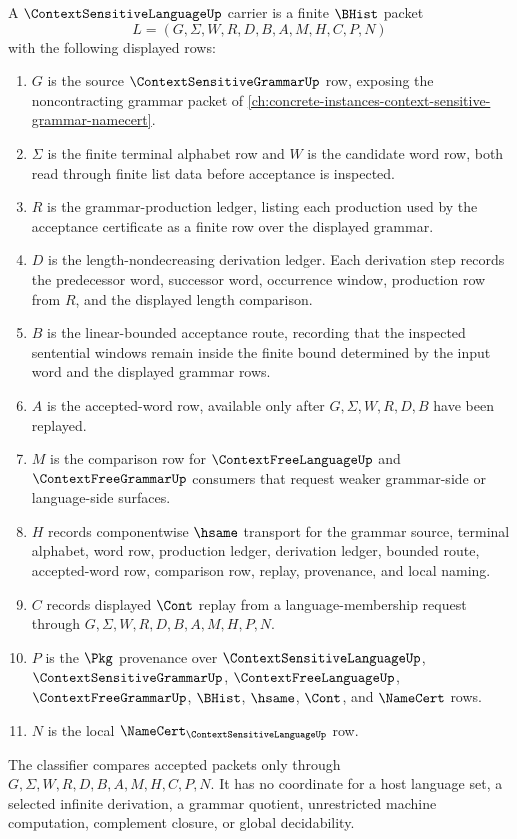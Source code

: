 \begin{definition}
\label{def:context-sensitive-language-carrier}
A $\ContextSensitiveLanguageUp$ carrier is a finite $\BHist$ packet
$$
L=(G,\Sigma,W,R,D,B,A,M,H,C,P,N)
$$
with the following displayed rows:
\begin{enumerate}
\item $G$ is the source $\ContextSensitiveGrammarUp$ row, exposing the noncontracting grammar packet of \autoref{ch:concrete-instances-context-sensitive-grammar-namecert}.
\item $\Sigma$ is the finite terminal alphabet row and $W$ is the candidate word row, both read through finite list data before acceptance is inspected.
\item $R$ is the grammar-production ledger, listing each production used by the acceptance certificate as a finite row over the displayed grammar.
\item $D$ is the length-nondecreasing derivation ledger. Each derivation step records the predecessor word, successor word, occurrence window, production row from $R$, and the displayed length comparison.
\item $B$ is the linear-bounded acceptance route, recording that the inspected sentential windows remain inside the finite bound determined by the input word and the displayed grammar rows.
\item $A$ is the accepted-word row, available only after $G,\Sigma,W,R,D,B$ have been replayed.
\item $M$ is the comparison row for $\ContextFreeLanguageUp$ and $\ContextFreeGrammarUp$ consumers that request weaker grammar-side or language-side surfaces.
\item $H$ records componentwise $\hsame$ transport for the grammar source, terminal alphabet, word row, production ledger, derivation ledger, bounded route, accepted-word row, comparison row, replay, provenance, and local naming.
\item $C$ records displayed $\Cont$ replay from a language-membership request through $G,\Sigma,W,R,D,B,A,M,H,P,N$.
\item $P$ is the $\Pkg$ provenance over $\ContextSensitiveLanguageUp$, $\ContextSensitiveGrammarUp$, $\ContextFreeLanguageUp$, $\ContextFreeGrammarUp$, $\BHist$, $\hsame$, $\Cont$, and $\NameCert$ rows.
\item $N$ is the local $\NameCert_{\ContextSensitiveLanguageUp}$ row.
\end{enumerate}
The classifier compares accepted packets only through $G,\Sigma,W,R,D,B,A,M,H,C,P,N$. It has no coordinate for a host language set, a selected infinite derivation, a grammar quotient, unrestricted machine computation, complement closure, or global decidability.
\end{definition}

